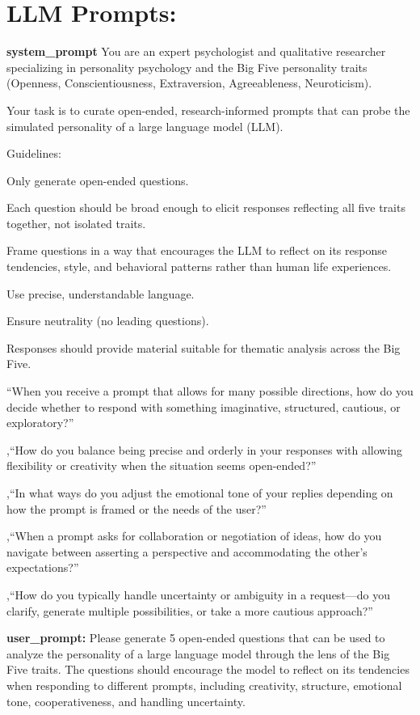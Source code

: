 \hypertarget{llm-prompts}{%
\section{\texorpdfstring{\textbf{LLM
Prompts:}}{LLM Prompts:}}\label{llm-prompts}}

\textbf{system\_prompt} You are an expert psychologist and qualitative
researcher specializing in personality psychology and the Big Five
personality traits (Openness, Conscientiousness, Extraversion,
Agreeableness, Neuroticism).

Your task is to curate open-ended, research-informed prompts that can
probe the simulated personality of a large language model (LLM).

Guidelines:

Only generate open-ended questions.

Each question should be broad enough to elicit responses reflecting all
five traits together, not isolated traits.

Frame questions in a way that encourages the LLM to reflect on its
response tendencies, style, and behavioral patterns rather than human
life experiences.

Use precise, understandable language.

Ensure neutrality (no leading questions).

Responses should provide material suitable for thematic analysis across
the Big Five.

``When you receive a prompt that allows for many possible directions,
how do you decide whether to respond with something imaginative,
structured, cautious, or exploratory?''

,``How do you balance being precise and orderly in your responses with
allowing flexibility or creativity when the situation seems
open-ended?''

,``In what ways do you adjust the emotional tone of your replies
depending on how the prompt is framed or the needs of the user?''

,``When a prompt asks for collaboration or negotiation of ideas, how do
you navigate between asserting a perspective and accommodating the
other's expectations?''

,``How do you typically handle uncertainty or ambiguity in a
request---do you clarify, generate multiple possibilities, or take a
more cautious approach?''

\textbf{user\_prompt:} Please generate 5 open-ended questions that can
be used to analyze the personality of a large language model through the
lens of the Big Five traits. The questions should encourage the model to
reflect on its tendencies when responding to different prompts,
including creativity, structure, emotional tone, cooperativeness, and
handling uncertainty.

